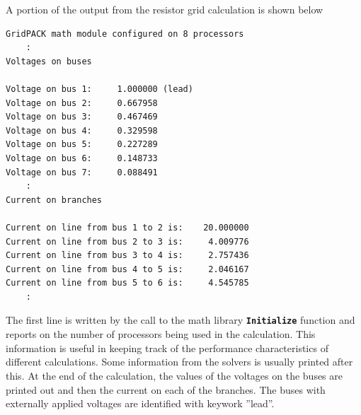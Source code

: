 A portion of the output from the resistor grid calculation is shown below

{
\color{red}
\begin{Verbatim}[fontseries=b]
GridPACK math module configured on 8 processors
    :
Voltages on buses

Voltage on bus 1:     1.000000 (lead)
Voltage on bus 2:     0.667958
Voltage on bus 3:     0.467469
Voltage on bus 4:     0.329598
Voltage on bus 5:     0.227289
Voltage on bus 6:     0.148733
Voltage on bus 7:     0.088491
    :
Current on branches

Current on line from bus 1 to 2 is:    20.000000
Current on line from bus 2 to 3 is:     4.009776
Current on line from bus 3 to 4 is:     2.757436
Current on line from bus 4 to 5 is:     2.046167
Current on line from bus 5 to 6 is:     4.545785
    :
\end{Verbatim}
}

The first line is written by the call to the math library
\texttt{\textbf{Initialize}} function and reports on the number of processors
being used in the calculation. This information is useful in keeping track of
the performance characteristics of different calculations. Some information from
the solvers is usually printed after this. At the end of the calculation, the
values of the voltages on the buses are printed out and then the current on each
of the branches. The buses with externally applied voltages are identified
with keywork ''lead''.
\newline
\hyperlink{topDoc}{\color{blue}{Top}}
